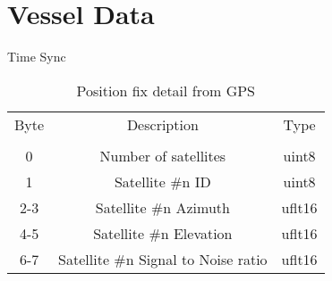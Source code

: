 \section{Vessel Data}
\label{msg006}
Time Sync
\begin{table}[H]
  \centering
  \begin{tabular}{ c c c }
  Byte & Description & Type \\
              &      &              \\
\hline
    0  & Number of satellites               & uint8  \\
    1  & Satellite \#n ID                   & uint8  \\
   2-3 & Satellite \#n Azimuth               & uflt16 \\
   4-5 & Satellite \#n Elevation             & uflt16 \\
   6-7 & Satellite \#n Signal to Noise ratio & uflt16 \\
  \end{tabular}
  \caption{Position fix detail from GPS}
\end{table}